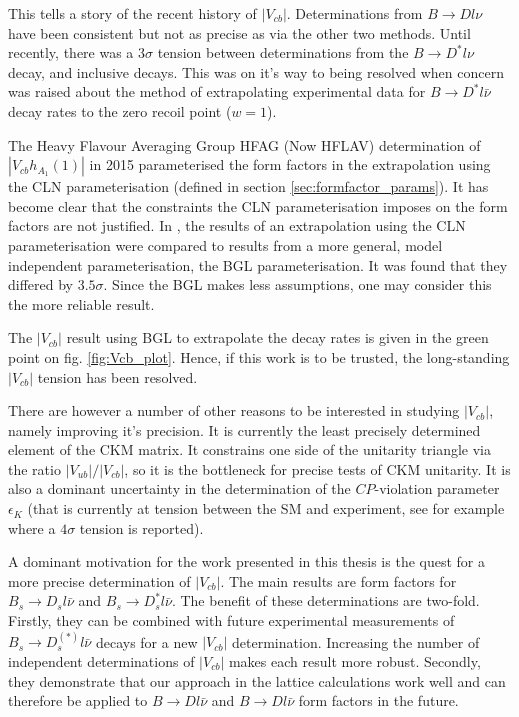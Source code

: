 This tells a story of the recent history of $|V_{cb}|$. Determinations from $B\to Dl\nu$ have been consistent but not as precise as via the other two methods. Until recently, there was a $3\sigma$ tension between determinations from the $B\to D^* l\nu$ decay, and inclusive decays. This was on it's way to being resolved when concern was raised about the method of extrapolating experimental data for $B\to D^*l\bar{\nu}$ decay rates to the zero recoil point ($w=1$).

The Heavy Flavour Averaging Group HFAG (Now HFLAV) determination of $|V_{cb}h_{A_1}(1)|$ in 2015 parameterised the form factors in the extrapolation using the CLN parameterisation (defined in section \ref{sec:formfactor_params}). It has become clear that the constraints the CLN parameterisation imposes on the form factors are not justified. In \cite{Bigi:2017njr,Grinstein:2017nlq}, the results of an extrapolation using the CLN parameterisation were compared to results from a more general, model independent parameterisation, the BGL parameterisation. It was found that they differed by $3.5\sigma$. Since the BGL makes less assumptions, one may consider this the more reliable result.

The $|V_{cb}|$ result using BGL to extrapolate the decay rates is given in the green point on fig. \ref{fig:Vcb_plot}. Hence, if this work is to be trusted, the long-standing $|V_{cb}|$ tension has been resolved.

There are however a number of other reasons to be interested in studying $|V_{cb}|$, namely improving it's precision. It is currently the least precisely determined element of the CKM matrix. It constrains one side of the unitarity triangle via the ratio $|V_{ub}|/|V_{cb}|$, so it is the bottleneck for precise tests of CKM unitarity. It is also a dominant uncertainty in the determination of the $CP$-violation parameter $\epsilon_K$ (that is currently at tension between the SM and experiment, see for example \cite{Bailey:2018feb} where a $4\sigma$ tension is reported).

A dominant motivation for the work presented in this thesis is the quest for a more precise determination of $|V_{cb}|$. The main results are form factors for $B_s\to D_s l\bar{\nu}$ and $B_s\to D_s^* l\bar{\nu}$. The benefit of these determinations are two-fold. Firstly, they can be combined with future experimental measurements of $B_s\to D_s^{(*)}l\bar{\nu}$ decays for a new $|V_{cb}|$ determination. Increasing the number of independent determinations of $|V_{cb}|$ makes each result more robust. Secondly, they demonstrate that our approach in the lattice calculations work well and can therefore be applied to $B\to Dl\bar{\nu}$ and $B\to Dl\bar{\nu}$ form factors in the future.

